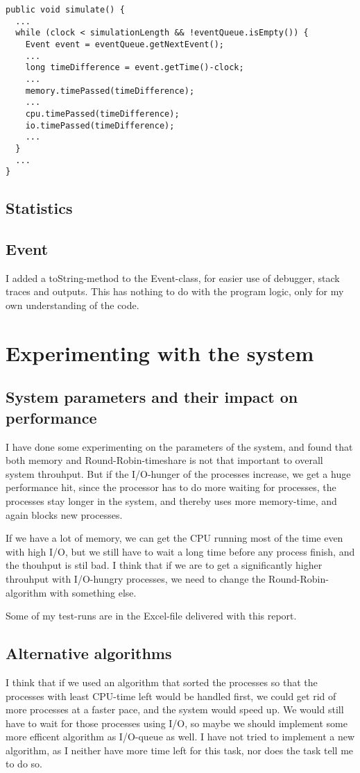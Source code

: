 \documentclass[norsk,a4paper]{article}
\begin{document}
\begin{lstlisting}
public void simulate() {
  ...
  while (clock < simulationLength && !eventQueue.isEmpty()) {
    Event event = eventQueue.getNextEvent();
    ...
    long timeDifference = event.getTime()-clock;
    ...
    memory.timePassed(timeDifference);
    ...
    cpu.timePassed(timeDifference);
    io.timePassed(timeDifference);
    ...
  }
  ...
}
\end{lstlisting}

\subsection{Statistics}

\subsection{Event}
I added a toString-method to the Event-class, for easier use of debugger, stack
traces and outputs. This has nothing to do with the program logic, only for my
own understanding of the code.

\section{Experimenting with the system}
\subsection{System parameters and their impact on performance}
I have done some experimenting on the parameters of the system, and found that
both memory and Round-Robin-timeshare is not that important to overall system
throuhput. But if the I/O-hunger of the processes increase, we get a huge
performance hit, since the processor has to do more waiting for processes, the
processes stay longer in the system, and thereby uses more memory-time, and
again blocks new processes.

If we have a lot of memory, we can get the CPU running most of the time even
with high I/O, but we still have to wait a long time before any process finish,
and the thouhput is stil bad. I think that if we are to get a significantly
higher throuhput with I/O-hungry processes, we need to change the
Round-Robin-algorithm with something else.

Some of my test-runs are in the Excel-file delivered with this report.
\subsection{Alternative algorithms}
I think that if we used an algorithm that sorted the processes so that the
processes with least CPU-time left would be handled first, we could get rid of
more processes at a faster pace, and the system would speed up. We would still
have to wait for those processes using I/O, so maybe we should implement some
more efficent algorithm as I/O-queue as well. I have not tried to implement a
new algorithm, as I neither have more time left for this task, nor does the task
tell me to do so.
\end{document}
